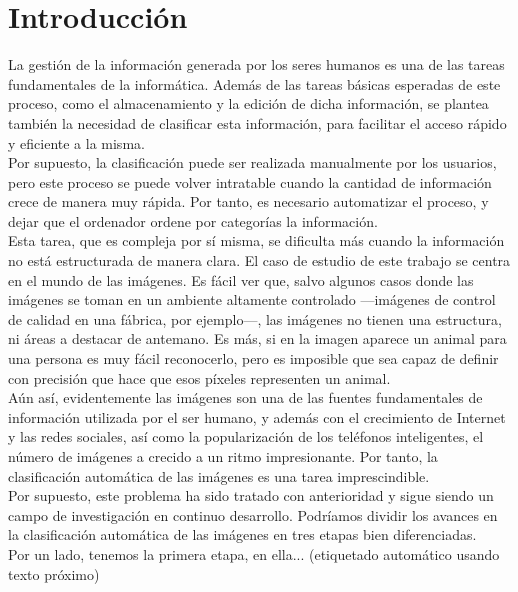 \chapter{Introducción}
La gestión de la información generada por los seres humanos es una de las tareas fundamentales de la informática. Además de las tareas básicas esperadas de este proceso, como el almacenamiento y la edición de dicha información, se plantea también la necesidad de clasificar esta información, para facilitar el acceso rápido y eficiente a la misma.\\

Por supuesto, la clasificación puede ser realizada manualmente por los usuarios, pero este proceso se puede volver intratable cuando la cantidad de información crece de manera muy rápida. Por tanto, es necesario automatizar el proceso, y dejar que el ordenador ordene por categorías la información.\\

Esta tarea, que es compleja por sí misma, se dificulta más cuando la información no está estructurada de manera clara. El caso de estudio de este trabajo se centra en el mundo de las imágenes. Es fácil ver que, salvo algunos casos donde las imágenes se toman en un ambiente altamente controlado ---imágenes de control de calidad en una fábrica, por ejemplo---, las imágenes no tienen una estructura, ni áreas a destacar de antemano. Es más, si en la imagen aparece un animal para una persona es muy fácil reconocerlo, pero es imposible que sea capaz de definir con precisión que hace que esos píxeles representen un animal.\\

Aún así, evidentemente las imágenes son una de las fuentes fundamentales de información utilizada por el ser humano, y además con el crecimiento de Internet y las redes sociales, así como la popularización de los teléfonos inteligentes, el número de imágenes a crecido a un ritmo impresionante. Por tanto, la clasificación automática de las imágenes es una tarea imprescindible.\\

Por supuesto, este problema ha sido tratado con anterioridad y sigue siendo un campo de investigación en continuo desarrollo. Podríamos dividir los avances en la clasificación automática de las imágenes en tres etapas bien diferenciadas.\\

Por un lado, tenemos la primera etapa, en ella... (etiquetado automático usando texto próximo)

